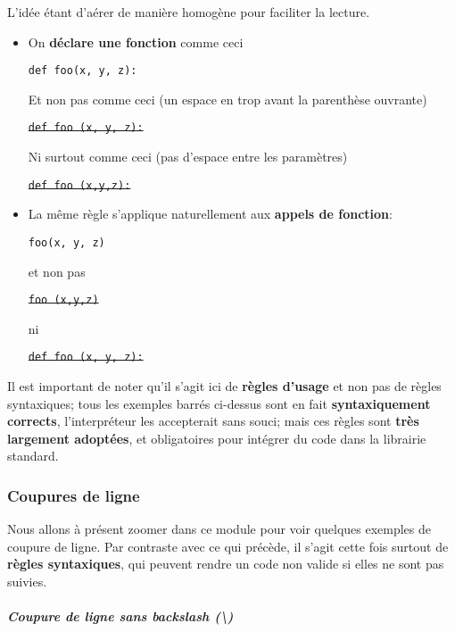 L'idée étant d'aérer de manière homogène pour faciliter la lecture.

    \begin{itemize}
\item
  On \textbf{déclare une fonction} comme ceci

  \texttt{def\ foo(x,\ y,\ z):}

  Et non pas comme ceci (un espace en trop avant la parenthèse ouvrante)

  \sout{\texttt{def\ foo\ (x,\ y,\ z):}}

  Ni surtout comme ceci (pas d'espace entre les paramètres)

  \sout{\texttt{def\ foo\ (x,y,z):}}
\end{itemize}

    \begin{itemize}
\item
  La même règle s'applique naturellement aux \textbf{appels de
  fonction}:

  \texttt{foo(x,\ y,\ z)}

  et non pas

  \sout{\texttt{foo\ (x,y,z)}}

  ni

  \sout{\texttt{def\ foo\ (x,\ y,\ z):}}
\end{itemize}

    Il est important de noter qu'il s'agit ici de \textbf{règles d'usage} et
non pas de règles syntaxiques; tous les exemples barrés ci-dessus sont
en fait \textbf{syntaxiquement corrects}, l'interpréteur les accepterait
sans souci; mais ces règles sont \textbf{très largement adoptées}, et
obligatoires pour intégrer du code dans la librairie standard.

    \hypertarget{coupures-de-ligne}{%
\subsubsection{Coupures de ligne}\label{coupures-de-ligne}}

    Nous allons à présent zoomer dans ce module pour voir quelques exemples
de coupure de ligne. Par contraste avec ce qui précède, il s'agit cette
fois surtout de \textbf{règles syntaxiques}, qui peuvent rendre un code
non valide si elles ne sont pas suivies.

    \hypertarget{coupure-de-ligne-sans-backslash}{%
\subparagraph{\texorpdfstring{Coupure de ligne sans \emph{backslash}
(\textbackslash{})}{Coupure de ligne sans backslash (\textbackslash{})}}\label{coupure-de-ligne-sans-backslash}}

